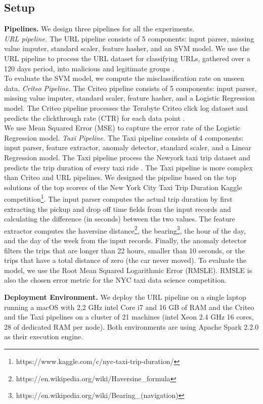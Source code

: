 \subsection{Setup}\label{subsec:setup}
\textbf{Pipelines.}
We design three pipelines for all the experiments.\\
\textit{URL pipeline. } The URL pipeline consists of 5 components: input parser, missing value imputer, standard scaler, feature hasher, and an SVM model.
We use the URL pipeline to process the URL dataset for classifying URLs, gathered over a 120 days period, into malicious and legitimate groups \cite{ma2009identifying}.\\
To evaluate the SVM model, we compute the misclassification rate on unseen data.
\textit{Criteo Pipeline.} 
The Criteo pipeline consists of 5 components: input parser, missing value imputer, standard scaler, feature hasher, and a Logistic Regression model.
The Criteo pipeline processes the Terabyte Criteo click log dataset and predicts the clickthrough rate (CTR) for each data point \cite{criteo-log}.\\
We use Mean Squared Error (MSE) to capture the error rate of the Logistic Regression model.
\textit{Taxi Pipeline.}
The Taxi pipeline consists of 4 components: input parser, feature extractor, anomaly detector, standard scaler, and a Linear Regression model.
The Taxi pipeline process the Newyork taxi trip dataset and predicts the trip duration of every taxi ride \cite{newyork-taxi}. The Taxi pipeline is more complex than Criteo and URL pipelines. We designed the pipeline based on the top solutions of the top scorers of the New York City Taxi Trip Duration Kaggle competition\footnote{https://www.kaggle.com/c/nyc-taxi-trip-duration/}. The input parser computes the actual trip duration by first extracting the pickup and drop off time fields from the input records and calculating the difference (in seconds) between the two values.
The feature extractor computes the haversine distance\footnote{https://en.wikipedia.org/wiki/Haversine\_formula}, the bearing\footnote{https://en.wikipedia.org/wiki/Bearing\_(navigation)}, the hour of the day, and the day of the week from the input records. Finally, the anomaly detector filters the trips that are longer than 22 hours, smaller than 10 seconds, or the trips that have a total distance of zero (the car never moved). 
To evaluate the model, we use the Root Mean Squared Logarithmic Error (RMSLE).
RMSLE is also the chosen error metric for the NYC taxi data science competition.

\textbf{Deployment Environment. }
We deploy the URL pipeline on a single laptop running a macOS with 2,2 GHz intel Core i7 and 16 GB of RAM and the Criteo and the Taxi pipelines on a cluster of 21 machines (intel Xeon 2.4 GHz 16 cores, 28 of dedicated RAM per node).
Both environments are using Apache Spark 2.2.0 as their execution engine.

